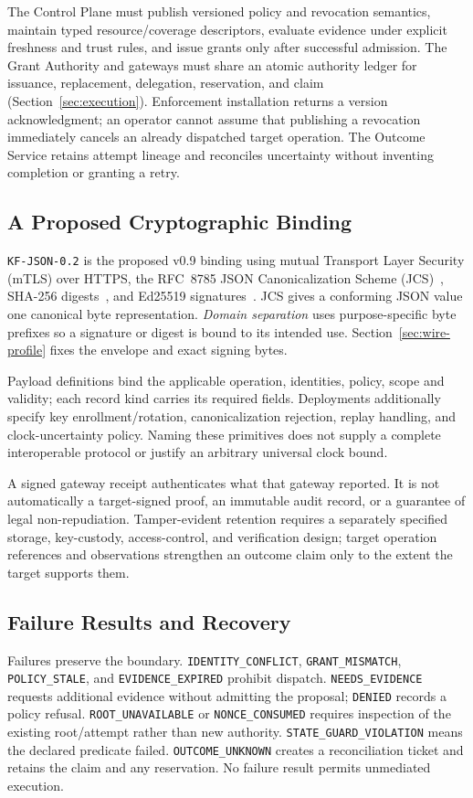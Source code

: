 The Control Plane must publish versioned policy and revocation semantics, maintain typed resource/coverage descriptors, evaluate evidence under explicit freshness and trust rules, and issue grants only after successful admission. The Grant Authority and gateways must share an atomic authority ledger for issuance, replacement, delegation, reservation, and claim (Section~\ref{sec:execution}). Enforcement installation returns a version acknowledgment; an operator cannot assume that publishing a revocation immediately cancels an already dispatched target operation. The Outcome Service retains attempt lineage and reconciles uncertainty without inventing completion or granting a retry.

\subsection{A Proposed Cryptographic Binding}
\texttt{KF-JSON-0.2} is the proposed v0.9 binding using mutual Transport Layer Security (mTLS) over HTTPS, the RFC~8785 JSON Canonicalization Scheme (JCS)~\cite{rfc8785}, SHA-256 digests~\cite{rfc6234}, and Ed25519 signatures~\cite{rfc8032}. JCS gives a conforming JSON value one canonical byte representation. \emph{Domain separation} uses purpose-specific byte prefixes so a signature or digest is bound to its intended use. Section~\ref{sec:wire-profile} fixes the envelope and exact signing bytes.

Payload definitions bind the applicable operation, identities, policy, scope and validity; each record kind carries its required fields. Deployments additionally specify key enrollment/rotation, canonicalization rejection, replay handling, and clock-uncertainty policy. Naming these primitives does not supply a complete interoperable protocol or justify an arbitrary universal clock bound.

A signed gateway receipt authenticates what that gateway reported. It is not automatically a target-signed proof, an immutable audit record, or a guarantee of legal non-repudiation. Tamper-evident retention requires a separately specified storage, key-custody, access-control, and verification design; target operation references and observations strengthen an outcome claim only to the extent the target supports them.

\subsection{Failure Results and Recovery}
Failures preserve the boundary. \nolinkurl{IDENTITY_CONFLICT}, \nolinkurl{GRANT_MISMATCH}, \nolinkurl{POLICY_STALE}, and \nolinkurl{EVIDENCE_EXPIRED} prohibit dispatch. \nolinkurl{NEEDS_EVIDENCE} requests additional evidence without admitting the proposal; \nolinkurl{DENIED} records a policy refusal. \nolinkurl{ROOT_UNAVAILABLE} or \nolinkurl{NONCE_CONSUMED} requires inspection of the existing root/attempt rather than new authority. \nolinkurl{STATE_GUARD_VIOLATION} means the declared predicate failed. \nolinkurl{OUTCOME_UNKNOWN} creates a reconciliation ticket and retains the claim and any reservation. No failure result permits unmediated execution.

